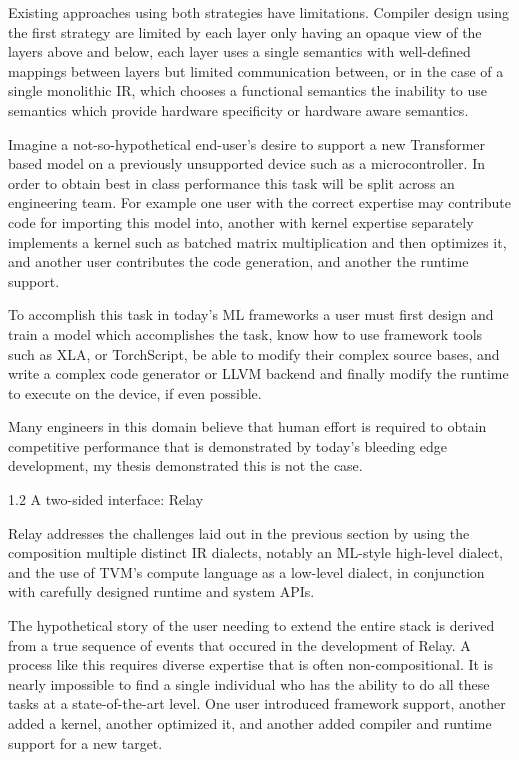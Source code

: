 Existing approaches using both strategies have limitations. Compiler design using the first strategy are limited by each layer only having an opaque view of the layers above and below, each layer uses a single semantics with well-defined mappings between layers but limited communication between, or in the case of a single monolithic IR, which chooses a functional semantics the inability to use semantics which provide hardware specificity or hardware aware semantics.

Imagine a not-so-hypothetical end-user’s desire to support a new Transformer based model on a previously unsupported device such as a microcontroller. In order to obtain best in class performance this task will be split across an engineering team. For example one user with the correct expertise may contribute code for importing this model into,  another with kernel expertise separately implements a kernel such as batched matrix multiplication and then optimizes it, and another user contributes the code generation, and another the runtime support.

To accomplish this task in today’s ML frameworks a user must first design and train a model which accomplishes the task, know how to use framework tools such as XLA, or TorchScript, be able to modify their complex source bases, and write a complex code generator or LLVM backend and finally modify the runtime to execute on the device, if even possible.

Many engineers in this domain believe that human effort is required to obtain competitive performance that is demonstrated by today’s bleeding edge development, my thesis demonstrated this is not the case.

1.2 A two-sided interface: Relay

Relay addresses the challenges laid out in the previous section by using the composition multiple distinct IR dialects, notably an ML-style high-level dialect, and the use of TVM’s compute language as a low-level dialect, in conjunction with carefully designed runtime and system APIs.

The hypothetical story of the user needing to extend the entire stack is derived from a true sequence of events that occured in the development of Relay. A process like this requires diverse expertise that is often non-compositional. It is nearly impossible to find a single individual who has the ability to do all these tasks at a state-of-the-art level.  One user introduced framework support, another added a kernel, another optimized it, and another added compiler and runtime support for a new target.

